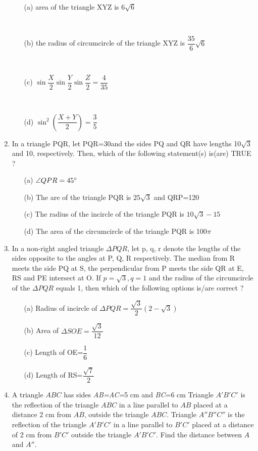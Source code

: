\documentclass[journal,12pt,twocolumn]{IEEEtran}
\begin{document}
\begin{enumerate}
 \begin{itemize}
 \item[(a)] area of the triangle XYZ is $6\sqrt{6}$ \item[~]
 \item[(b)] the radius of circumcircle of the triangle XYZ is $\dfrac{35}{6}\sqrt{6}$\item[~]
 \item[(c)] $\sin\dfrac{X}{2}\sin\dfrac{Y}{2}\sin\dfrac{Z}{2}=\dfrac{4}{35}$ \item[~]
 \item[(d)] $\sin^2\left(\dfrac{X+Y}{2}\right)=\dfrac{3}{5}$
 \end{itemize}
 \item  In a triangle PQR, let \angle PQR=30\degree and the sides PQ and QR have lengths 10$\sqrt{3}$ and 10, respectively. Then, which of the following statement(s) is(are) TRUE ?
 \begin{itemize}
 \item[(a)] $\angle QPR=45\degree$
 \item[(b)] The are of the triangle PQR is $25\sqrt{3}$ and \angle QRP=120\degree
 \item[(c)] The radius of the incircle of the triangle PQR is $10\sqrt{3}-15$
 \item[(d)] The area of the circumcircle of the triangle PQR is 100$\pi$
 \end{itemize}
 \item In a non-right angled triangle $\Delta PQR$, let p, q, r denote the lengths of the sides opposite to the angles at P, Q, R respectively. The median from R meets the side PQ at S, the perpendicular from P meets the side QR at E, RS and PE intersect at O. If $p=\sqrt{3}, q=1$ and the radius of the circumcircle of the $\Delta PQR$ equals 1, then which of the following options is/are correct ?
 \begin{itemize}
 \item[(a)] Radius of incircle of $\Delta PQR=\dfrac{\sqrt{3}}{2}\left(2-\sqrt{3}\right)$
 \item[(b)] Area of $\Delta SOE=\dfrac{\sqrt{3}}{12}$
 \item[(c)] Length of OE=$\dfrac{1}{6}$
 \item[(d)] Length of RS=$\dfrac{\sqrt{7}}{2}$
 \end{itemize}
 \item A triangle $ABC$ has sides \textsl{AB=AC=}5 cm and \textsl{BC}=6 cm Triangle $A'B'C'$ is the reflection of the triangle $ABC$ in a line parallel to $AB$ placed at a distance 2 cm from $AB$, outside the triangle $ABC$. Triangle $A''B''C''$ is the reflection of the triangle $A'B'C'$ in a line parallel to $B'C'$ placed at a distance of 2 cm from $B'C'$ outside the triangle $A'B'C'$. Find the distance between $A$ and $A''$.

\end{enumerate}
\end{document}
